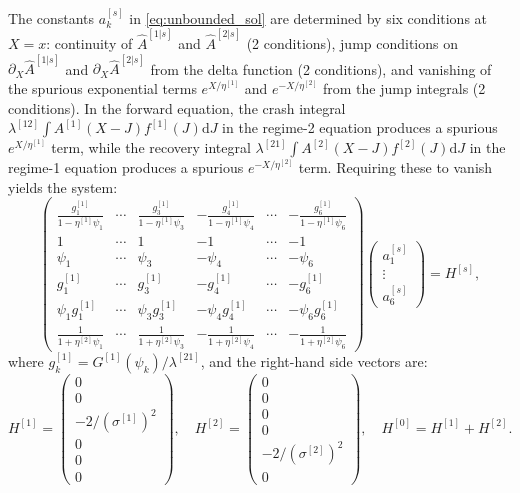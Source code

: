 \documentclass[11pt,a4paper]{article}
\numberwithin{equation}{section}
\newcommand{\dd}{\mathrm{d}}
\begin{document}
\begin{appendices}
The constants $a^{[s]}_k$ in \eqref{eq:unbounded_sol} are determined by six conditions at $X = x$: continuity of $\hat{A}^{[1|s]}$ and $\hat{A}^{[2|s]}$ (2 conditions), jump conditions on $\partial_X \hat{A}^{[1|s]}$ and $\partial_X \hat{A}^{[2|s]}$ from the delta function (2 conditions), and vanishing of the spurious exponential terms $e^{X/\eta^{[1]}}$ and $e^{-X/\eta^{[2]}}$ from the jump integrals (2 conditions). In the forward equation, the crash integral $\lambda^{[12]}\int A^{[1]}(X-J)f^{[1]}(J)\dd J$ in the regime-2 equation produces a spurious $e^{X/\eta^{[1]}}$ term, while the recovery integral $\lambda^{[21]}\int A^{[2]}(X-J)f^{[2]}(J)\dd J$ in the regime-1 equation produces a spurious $e^{-X/\eta^{[2]}}$ term. Requiring these to vanish yields the system:
\begin{equation}\label{eq:6x6_full}
\begin{pmatrix}
\frac{g^{[1]}_1}{1-\eta^{[1]}\psi_1} & \cdots & \frac{g^{[1]}_3}{1-\eta^{[1]}\psi_3} & -\frac{g^{[1]}_4}{1-\eta^{[1]}\psi_4} & \cdots & -\frac{g^{[1]}_6}{1-\eta^{[1]}\psi_6} \\
1 & \cdots & 1 & -1 & \cdots & -1 \\
\psi_1 & \cdots & \psi_3 & -\psi_4 & \cdots & -\psi_6 \\
g^{[1]}_1 & \cdots & g^{[1]}_3 & -g^{[1]}_4 & \cdots & -g^{[1]}_6 \\
\psi_1 g^{[1]}_1 & \cdots & \psi_3 g^{[1]}_3 & -\psi_4 g^{[1]}_4 & \cdots & -\psi_6 g^{[1]}_6 \\
\frac{1}{1+\eta^{[2]}\psi_1} & \cdots & \frac{1}{1+\eta^{[2]}\psi_3} & -\frac{1}{1+\eta^{[2]}\psi_4} & \cdots & -\frac{1}{1+\eta^{[2]}\psi_6}
\end{pmatrix}
\begin{pmatrix} a^{[s]}_1 \\ \vdots \\ a^{[s]}_6 \end{pmatrix}
= H^{[s]},
\end{equation}
where $g^{[1]}_k = G^{[1]}(\psi_k)/\lambda^{[21]}$, and the right-hand side vectors are:
\begin{equation}
H^{[1]} = \begin{pmatrix} 0 \\ 0 \\ -2/(\sigma^{[1]})^2 \\ 0 \\ 0 \\ 0 \end{pmatrix}, \quad
H^{[2]} = \begin{pmatrix} 0 \\ 0 \\ 0 \\ 0 \\ -2/(\sigma^{[2]})^2 \\ 0 \end{pmatrix}, \quad
H^{[0]} = H^{[1]} + H^{[2]}.
\end{equation}


\end{appendices}
\end{document}

